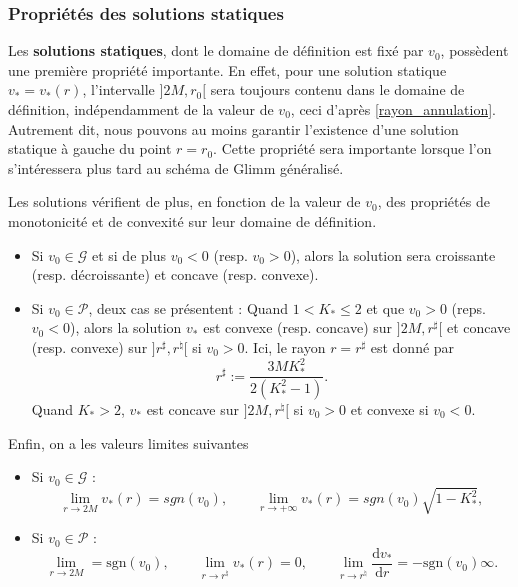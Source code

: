 \documentclass[11pt,a4paper]{article}
\begin{document}
\subsubsection{Propriétés des solutions statiques}

Les \textbf{solutions statiques}, dont le domaine de définition est fixé par $v_0$, possèdent une première propriété importante. En effet, pour une solution statique $v_* = v_*(r)$, l'intervalle $]2M, r_0[$ sera toujours contenu dans le domaine de définition, indépendamment de la valeur de $v_0$, ceci d'après \eqref{rayon_annulation}. Autrement dit, nous pouvons au moins garantir l'existence d'une solution statique à gauche du point $r=r_0$. Cette propriété sera importante lorsque l'on s'intéressera plus tard au schéma de Glimm généralisé.

Les solutions vérifient de plus, en fonction de la valeur de $v_0$, des propriétés de monotonicité et de convexité sur leur domaine de définition.
\begin{itemize}
\item Si $v_0 \in \mathcal{G}$ et si de plus $v_0 < 0$ (resp. $v_0> 0$), alors la solution sera croissante (resp. décroissante) et concave (resp. convexe).
\item Si $v_0 \in \mathcal{P}$, deux cas se présentent :
	\subitem Quand $1 < K_*\leq 2$ et que $v_0 >0$ (reps. $v_0<0$), alors la solution $v_*$ est convexe (resp. concave) sur $]2M, r^\sharp[$ et concave (resp. convexe) sur $]r^\sharp,r^\natural[$ si $v_0 > 0$. Ici, le rayon $r=r^\sharp$ est donné par
\begin{equation}
	r^\sharp := \frac{3MK_*^2}{2\left(K_*^2-1\right)}.
\end{equation}
	\subitem Quand $K_* > 2$, $v_*$ est concave sur $]2M, r^\natural[$ si $v_0>0$ et convexe si $v_0<0$.
\end{itemize}

Enfin, on a les valeurs limites suivantes
\begin{itemize}
\item Si $v_0 \in \mathcal{G}$ :
\begin{equation}
	\lim\limits_{r\rightarrow 2M} v_*(r) = sgn(v_0), \qquad \lim\limits_{r\rightarrow +\infty} v_*(r) = sgn(v_0)\sqrt{1 - K_*^2},
\end{equation}
\item Si $v_0 \in \mathcal{P}$ :
\begin{equation}
	\lim\limits_{r\rightarrow 2M} = \text{sgn}(v_0),\qquad \lim\limits_{r\rightarrow r^\natural} v_*(r) = 0, \qquad \lim\limits_{r\rightarrow r^\natural} \frac{\mathrm{d}v_*}{\mathrm{d}r} = -\text{sgn}(v_0)\infty.
\end{equation}
\end{itemize}
\end{document}
